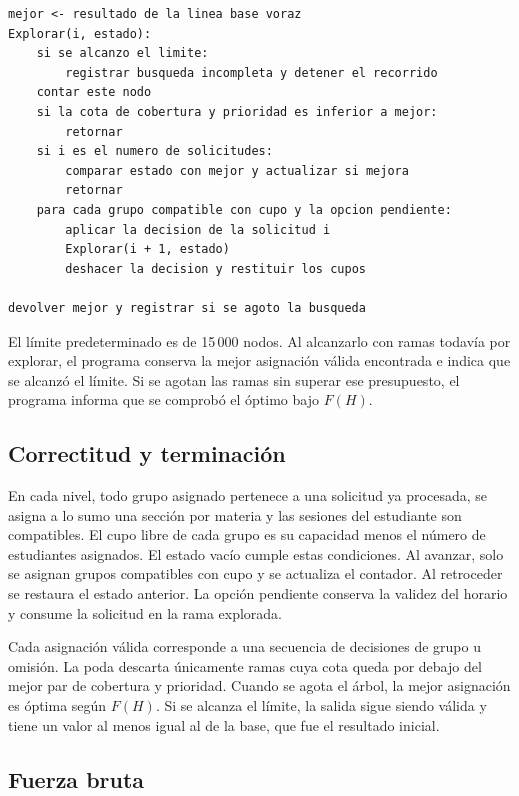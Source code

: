 \documentclass[11pt]{article}
\numberwithin{equation}{section}
\numberwithin{figure}{section}
\numberwithin{table}{section}
\theoremstyle{definition}
\begin{document}
\begin{verbatim}
mejor <- resultado de la linea base voraz
Explorar(i, estado):
    si se alcanzo el limite:
        registrar busqueda incompleta y detener el recorrido
    contar este nodo
    si la cota de cobertura y prioridad es inferior a mejor:
        retornar
    si i es el numero de solicitudes:
        comparar estado con mejor y actualizar si mejora
        retornar
    para cada grupo compatible con cupo y la opcion pendiente:
        aplicar la decision de la solicitud i
        Explorar(i + 1, estado)
        deshacer la decision y restituir los cupos

devolver mejor y registrar si se agoto la busqueda
\end{verbatim}

El límite predeterminado es de 15\,000 nodos. Al alcanzarlo con ramas
todavía por explorar, el programa conserva la mejor asignación válida
encontrada e indica que se alcanzó el límite. Si se agotan las ramas
sin superar ese presupuesto, el programa informa que se comprobó el
óptimo bajo \(F(H)\).

\subsection{Correctitud y terminación}

En cada nivel, todo grupo asignado pertenece a una solicitud ya
procesada, se asigna a lo sumo una sección por materia y las sesiones
del estudiante son compatibles. El cupo libre de cada grupo es
su capacidad menos el número de estudiantes asignados. El estado
vacío cumple estas condiciones. Al avanzar, solo se asignan grupos
compatibles con cupo y se actualiza el contador. Al retroceder se
restaura el estado anterior. La opción pendiente conserva la validez
del horario y consume la solicitud en la rama explorada.

Cada asignación válida corresponde a una secuencia de decisiones
de grupo u omisión. La poda descarta únicamente ramas cuya cota
queda por debajo del mejor par de cobertura y prioridad. Cuando se
agota el árbol, la mejor asignación es óptima según \(F(H)\). Si se
alcanza el límite, la salida sigue siendo válida y tiene un valor
al menos igual al de la base, que fue el resultado inicial.

\subsection{Fuerza bruta}
\end{document}

